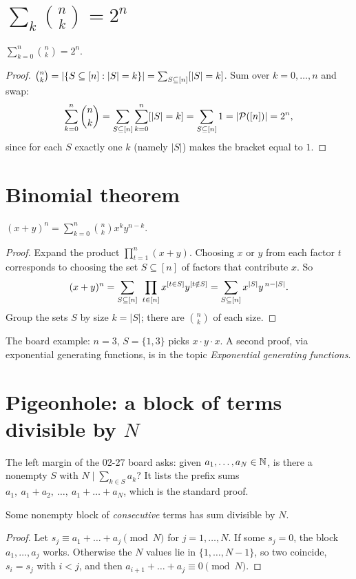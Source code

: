 \documentclass[11pt]{article}
\begin{document}
\section*{$\sum_k\binom nk = 2^n$}

\begin{theorem}
$\displaystyle\sum_{k=0}^n\binom nk=2^n$.
\end{theorem}
\begin{proof}
$\binom nk=|\{S\subseteq[n]:|S|=k\}|=\sum_{S\subseteq[n]}[|S|=k]$. Sum over $k=0,\dots,n$ and swap:
\[
\sum_{k=0}^n\binom nk=\sum_{S\subseteq[n]}\sum_{k=0}^n[|S|=k]=\sum_{S\subseteq[n]}1=|\mathcal{P}([n])|=2^n,
\]
since for each $S$ exactly one $k$ (namely $|S|$) makes the bracket equal to $1$.
\end{proof}

\section*{Binomial theorem}

\begin{theorem}
$(x+y)^n=\displaystyle\sum_{k=0}^n\binom nk x^ky^{n-k}$.
\end{theorem}
\begin{proof}
Expand the product $\prod_{t=1}^n(x+y)$. Choosing $x$ or $y$ from each factor $t$ corresponds to choosing the set $S\subseteq[n]$ of factors that contribute $x$. So
\[
(x+y)^n=\sum_{S\subseteq[n]}\ \prod_{t\in[n]}x^{\iv{t\in S}}y^{\iv{t\notin S}}
=\sum_{S\subseteq[n]}x^{|S|}y^{\,n-|S|}.
\]
Group the sets $S$ by size $k=|S|$; there are $\binom nk$ of each size.
\end{proof}

The board example: $n=3$, $S=\{1,3\}$ picks $x\cdot y\cdot x$.
A second proof, via exponential generating functions, is in the topic \emph{Exponential generating functions}.

\section*{Pigeonhole: a block of terms divisible by $N$}

The left margin of the 02-27 board asks: given $a_1,\dots,a_N\in\mathbb{N}$, is there a nonempty $S$ with $N\mid\sum_{k\in S}a_k$? It lists the prefix sums $a_1,\ a_1+a_2,\ \dots,\ a_1+\dots+a_N$, which is the standard proof.

\begin{claim}
Some nonempty block of \emph{consecutive} terms has sum divisible by $N$.
\end{claim}
\begin{proof}
Let $s_j\equiv a_1+\dots+a_j\pmod N$ for $j=1,\dots,N$. If some $s_j=0$, the block $a_1,\dots,a_j$ works. Otherwise the $N$ values lie in $\{1,\dots,N-1\}$, so two coincide, $s_i=s_j$ with $i<j$, and then $a_{i+1}+\dots+a_j\equiv0\pmod N$.
\end{proof}
\end{document}
